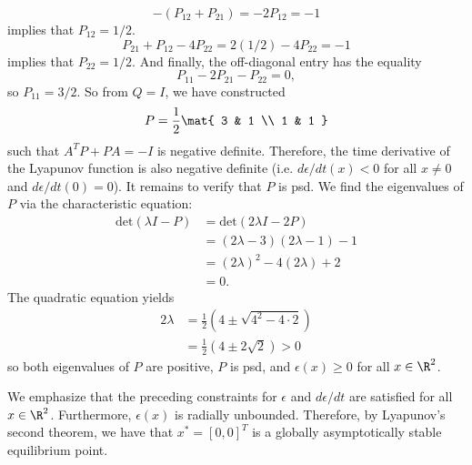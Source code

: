 \documentclass{homework}
\begin{document}
\begin{equation*}
    -(P_{12} + P_{21}) = -2P_{12} = -1
\end{equation*}
implies that $P_{12} = 1/2$. 
\begin{equation*}
    P_{21} + P_{12} - 4P_{22} = 2(1/2) - 4 P_{22} = -1
\end{equation*}
implies that $P_{22} = 1/2$. And finally, the off-diagonal entry
has the equality
\begin{equation*}
    P_{11} - 2P_{21} - P_{22} = 0,
\end{equation*}
so $P_{11} = 3/2$. So from $Q=I$, we have constructed
\begin{equation*}
    P = \frac{1}{2} \mat{
        3 & 1 \\
        1 & 1
    }
\end{equation*}
such that $A^TP + PA = -I$ is negative definite. Therefore, the time
derivative of the Lyapunov function is also negative definite (i.e.
    $d\epsilon/dt(x) < 0$ for all $x\neq0$ and $d\epsilon/dt(0) = 0$).
It remains to verify that $P$ is psd. We find the eigenvalues of $P$
via the characteristic equation:
\begin{align*}
    \text{det}(\lambda I - P) &= \text{det}(2\lambda I - 2P) \\
        &= (2\lambda - 3) (2\lambda - 1) - 1 \\
        &= (2\lambda)^2 - 4 (2\lambda) + 2 \\
        &= 0.
\end{align*}
The quadratic equation yields
\begin{align*}
    2\lambda &= \frac{1}{2} (4 \pm \sqrt{4^2 - 4\cdot 2}) \\
        &= \frac{1}{2} (4 \pm 2 \sqrt{2}) > 0
\end{align*}
so both eigenvalues of $P$ are positive, $P$ is psd, and $\epsilon(x) \geq 0$
for all $x\in\R^2$.

We emphasize that the preceding constraints for $\epsilon$ and
$d\epsilon/dt$ are satisfied for all $x\in\R^2$. Furthermore,
$\epsilon(x)$ is radially unbounded. Therefore, by Lyapunov's second
theorem, we have that $x^* = [0, 0]^T$ is a globally asymptotically stable
equilibrium point. 

\subsection{}
\end{document}
